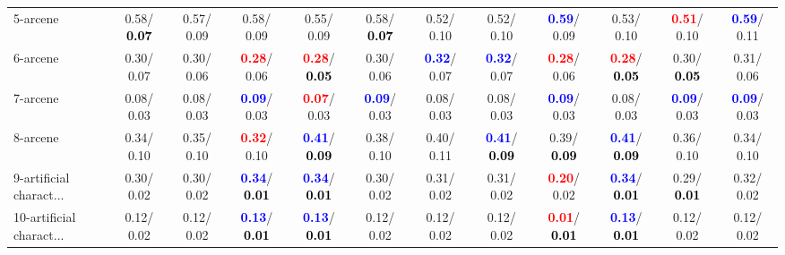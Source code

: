 \begin{table}[h]
\begin{center}
{\begin{tabular}{lc|c|c|c|c|c|c|c|c|c|c}
5-arcene &   0.58/\textcolor{black}{\textbf{  0.07}} &   0.57/  0.09 &   0.58/  0.09 &   0.55/  0.09 &   0.58/\textcolor{black}{\textbf{  0.07}} &   0.52/  0.10 &   0.52/  0.10 & \textcolor{blue}{\textbf{  0.59}}/  0.09 &   0.53/  0.10 & \textcolor{red}{\textbf{  0.51}}/  0.10 & \textcolor{blue}{\textbf{  0.59}}/  0.11 \\
6-arcene &   0.30/  0.07 &   0.30/  0.06 & \textcolor{red}{\textbf{  0.28}}/  0.06 & \textcolor{red}{\textbf{  0.28}}/\textcolor{black}{\textbf{  0.05}} &   0.30/  0.06 & \textcolor{blue}{\textbf{  0.32}}/  0.07 & \textcolor{blue}{\textbf{  0.32}}/  0.07 & \textcolor{red}{\textbf{  0.28}}/  0.06 & \textcolor{red}{\textbf{  0.28}}/\textcolor{black}{\textbf{  0.05}} &   0.30/\textcolor{black}{\textbf{  0.05}} &   0.31/  0.06 \\
7-arcene &   0.08/  0.03 &   0.08/  0.03 & \textcolor{blue}{\textbf{  0.09}}/  0.03 & \textcolor{red}{\textbf{  0.07}}/  0.03 & \textcolor{blue}{\textbf{  0.09}}/  0.03 &   0.08/  0.03 &   0.08/  0.03 & \textcolor{blue}{\textbf{  0.09}}/  0.03 &   0.08/  0.03 & \textcolor{blue}{\textbf{  0.09}}/  0.03 & \textcolor{blue}{\textbf{  0.09}}/  0.03 \\ \hline
8-arcene &   0.34/  0.10 &   0.35/  0.10 & \textcolor{red}{\textbf{  0.32}}/  0.10 & \textcolor{blue}{\textbf{  0.41}}/\textcolor{black}{\textbf{  0.09}} &   0.38/  0.10 &   0.40/  0.11 & \textcolor{blue}{\textbf{  0.41}}/\textcolor{black}{\textbf{  0.09}} &   0.39/\textcolor{black}{\textbf{  0.09}} & \textcolor{blue}{\textbf{  0.41}}/\textcolor{black}{\textbf{  0.09}} &   0.36/  0.10 &   0.34/  0.10 \\
9-artificial charact... &   0.30/  0.02 &   0.30/  0.02 & \textcolor{blue}{\textbf{  0.34}}/\textcolor{black}{\textbf{  0.01}} & \textcolor{blue}{\textbf{  0.34}}/\textcolor{black}{\textbf{  0.01}} &   0.30/  0.02 &   0.31/  0.02 &   0.31/  0.02 & \textcolor{red}{\textbf{  0.20}}/  0.02 & \textcolor{blue}{\textbf{  0.34}}/\textcolor{black}{\textbf{  0.01}} &   0.29/\textcolor{black}{\textbf{  0.01}} &   0.32/  0.02 \\
10-artificial charact... &   0.12/  0.02 &   0.12/  0.02 & \textcolor{blue}{\textbf{  0.13}}/\textcolor{black}{\textbf{  0.01}} & \textcolor{blue}{\textbf{  0.13}}/\textcolor{black}{\textbf{  0.01}} &   0.12/  0.02 &   0.12/  0.02 &   0.12/  0.02 & \textcolor{red}{\textbf{  0.01}}/\textcolor{black}{\textbf{  0.01}} & \textcolor{blue}{\textbf{  0.13}}/\textcolor{black}{\textbf{  0.01}} &   0.12/  0.02 &   0.12/  0.02 \\

\end{tabular}}
\end{center}
\end{table}
